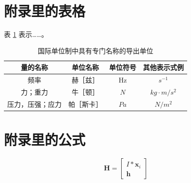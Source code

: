 



\section{附录里的表格}
表 \ref{tabA1} 表示……。
\begin{table}[h]
	\centering
	\caption{国际单位制中具有专门名称的导出单位}		
	\label{tabA1}
	\begin{tabular}{c|c|c|c}
		\toprule[2pt]
		量的名称 & 单位名称 & 单位符号 & 其他表示式例\\
		\midrule[2pt]
		频率	& 赫［兹］	& Hz	&$s^{-1}$ \\
		\hline                                        %
		力；重力 	& 牛［顿］	& $N$	 & $kg·m/s^2$ \\
		\hline                                         %
		压力，压强；应力	& 帕［斯卡］	&$Pa$	&$N/m^2$ \\
		\bottomrule[2pt]
	\end{tabular}
\end{table}

\section{附录里的公式}
\label{sec:formula}
\begin{equation}
\label{eqA1}
\textbf{H} = \begin{bmatrix}
I*\bm {x}_i \\ \textbf{h}
\end{bmatrix}
\end{equation}

\endinput
